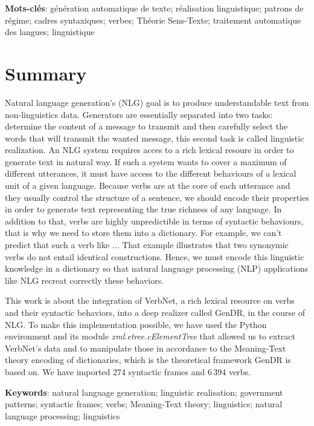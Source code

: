 \textbf{Mots-clés}: génération automatique de texte; réalisation linguistique; patrons de régime; cadres syntaxiques; verbes; Théorie Sens-Texte; traitement automatique des langues; linguistique

\chapter*{Summary}

Natural language generation's (NLG) goal is to produce understandable text from non-linguistics data. Generators are essentially separated into two tasks: determine the content of a message to transmit and then carefully select the words that will transmit the wanted message, this second task is called linguistic realization. An NLG system requires acces to a rich lexical resoure in order to generate text in natural way. If such a system wants to cover a maximum of different utterances, it must have access to the different behaviours of a lexical unit of a given language. Because verbs are at the core of each utterance and they usually control the structure of a sentence, we should encode their properties in order to generate text representing the true richness of any language. In addition to that, verbs are highly unpredictible in terms of syntactic behaviours, that is why we need to store them into a dictionary. For example, we can't predict that such a verb like ... That example illustrates that two synonymic verbs do not entail identical constructions. Hence, we must encode this linguistic knowledge in a dictionary so that natural language processing (NLP) applications like NLG recreat correctly these behaviors.

This work is about the integration of VerbNet, a rich lexical resource on verbs and their syntactic behaviors, into a deep realizer called GenDR, in the course of NLG. To make this implementation possible, we have used the Python environment and its module \emph{xml.etree.cElementTree} that allowed us to extract VerbNet's data and to manipulate those in accordance to the Meaning-Text theory encoding of dictionaries, which is the theoretical framework GenDR is based on. We have imported 274 syntactic frames and 6\,394 verbs.

\textbf{Keywords}: natural language generation; linguistic realisation; government patterns; syntactic frames; verbs; Meaning-Text theory; linguistics; natural language processing; linguistics